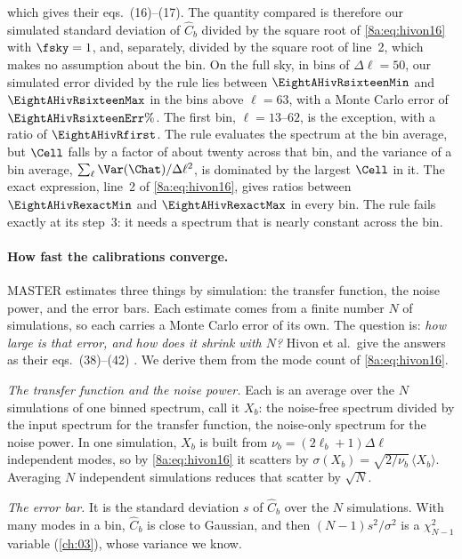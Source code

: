which gives their eqs.~(16)--(17). The quantity compared is therefore our simulated standard
deviation of $\widehat C_b$ divided by the square root of \eqref{8a:eq:hivon16} with
$\fsky=1$, and, separately, divided by the square root of line~2, which makes no assumption
about the bin. On the full sky, in bins of $\Delta\ell=50$,
our simulated error divided by the rule lies between $\EightAHivRsixteenMin$ and
$\EightAHivRsixteenMax$ in the bins above $\ell=63$, with a Monte Carlo error of
$\EightAHivRsixteenErr\%$. The first bin, $\ell=13$--$62$, is the exception, with a ratio of
$\EightAHivRfirst$. The rule evaluates the spectrum at the bin average, but $\Cell$ falls by a
factor of about twenty across that bin, and the variance of a bin average,
$\sum_\ell\Var(\Chat)/\Delta\ell^2$, is dominated by the largest $\Cell$ in it. The exact
expression, line~2 of \eqref{8a:eq:hivon16}, gives ratios between $\EightAHivRexactMin$ and
$\EightAHivRexactMax$ in every bin. The rule fails exactly at its step~3: it needs a spectrum that
is nearly constant across the bin.

\paragraph{How fast the calibrations converge.}
MASTER estimates three things by simulation: the transfer function, the noise power, and the
error bars. Each estimate comes from a finite number $N$ of simulations, so each carries a
Monte Carlo error of its own. The question is: \emph{how large is that error, and how does it
shrink with $N$?} Hivon et al.\ give the answers as their eqs.~(38)--(42) .
We derive them from the mode count of \eqref{8a:eq:hivon16}.

\emph{The transfer function and the noise power.} Each is an average over the $N$ simulations of
one binned spectrum, call it $X_b$: the noise-free spectrum divided by the input spectrum for the
transfer function, the noise-only spectrum for the noise power. In one simulation, $X_b$ is built
from $\nu_b=(2\ell_b+1)\Delta\ell$ independent modes, so by \eqref{8a:eq:hivon16} it scatters by
$\sigma(X_b)=\sqrt{2/\nu_b}\,\langle X_b\rangle$. Averaging $N$ independent simulations reduces
that scatter by $\sqrt N$.

\emph{The error bar.} It is the standard deviation $s$ of $\widehat C_b$ over the $N$
simulations. With many modes in a bin, $\widehat C_b$ is close to Gaussian, and then
$(N-1)s^2/\sigma^2$ is a $\chi^2_{N-1}$ variable (\cref{ch:03}), whose variance we know.

